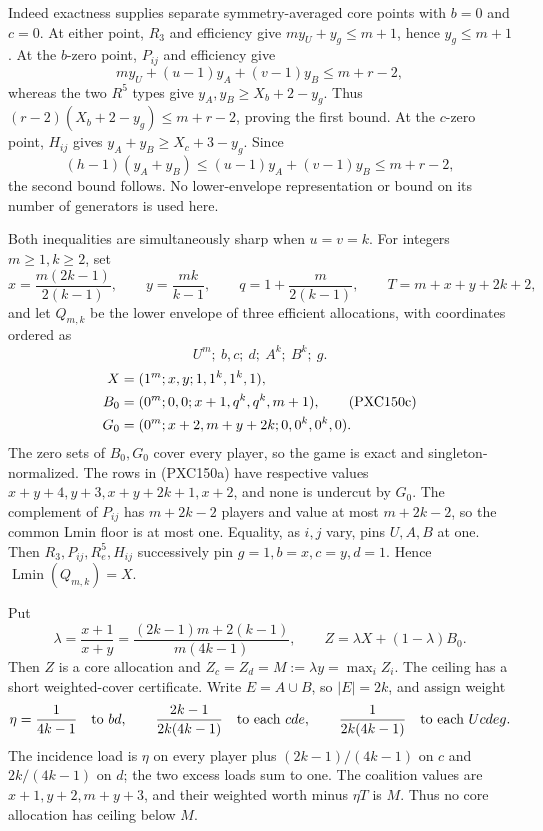 \documentclass[11pt]{article}
\newcommand{\Lmin}{\operatorname{Lmin}}
\begin{document}
Indeed exactness supplies separate symmetry-averaged core points with
\(b=0\) and \(c=0\).  At either point, \(R_3\) and efficiency give
\(m y_U+y_g\le m+1\), hence \(y_g\le m+1\).  At the \(b\)-zero point,
\(P_{ij}\) and efficiency give
\[
 m y_U+(u-1)y_A+(v-1)y_B\le m+r-2,
\]
whereas the two \(R^5\) types give
\(y_A,y_B\ge X_b+2-y_g\).  Thus
\((r-2)(X_b+2-y_g)\le m+r-2\), proving the first bound.
At the \(c\)-zero point, \(H_{ij}\) gives
\(y_A+y_B\ge X_c+3-y_g\).  Since
\[
 (h-1)(y_A+y_B)\le (u-1)y_A+(v-1)y_B\le m+r-2,
\]
the second bound follows.  No lower-envelope representation or bound on its
number of generators is used here.

Both inequalities are simultaneously sharp when \(u=v=k\).  For integers
\(m\ge1,k\ge2\), set
\[
 x=\frac{m(2k-1)}{2(k-1)},\qquad y=\frac{mk}{k-1},\qquad
 q=1+\frac{m}{2(k-1)},\qquad T=m+x+y+2k+2,
\]
and let \(Q_{m,k}\) be the lower envelope of three efficient allocations, with
coordinates ordered as
\[
 U^m;\ b,c;\ d;\ A^k;\ B^k;\ g.
\]
\begin{align}
 X&=(1^m;x,y;1,1^k,1^k,1),\notag\\
 B_0&=(0^m;0,0;x+1,q^k,q^k,m+1),                 \tag{PXC150c}\\
 G_0&=(0^m;x+2,m+y+2k;0,0^k,0^k,0).\notag
\end{align}
The zero sets of \(B_0,G_0\) cover every player, so the game is exact and
singleton-normalized.  The rows in (PXC150a) have respective values
\(x+y+4,y+3,x+y+2k+1,x+2\), and none is undercut by \(G_0\).
The complement of \(P_{ij}\) has \(m+2k-2\) players and value at most
\(m+2k-2\), so the common Lmin floor is at most one.  Equality, as \(i,j\)
vary, pins \(U,A,B\) at one.  Then \(R_3,P_{ij},R^5_e,H_{ij}\) successively
pin \(g=1,b=x,c=y,d=1\).  Hence \(\Lmin(Q_{m,k})=X\).

Put
\begin{equation}
 \lambda=\frac{x+1}{x+y}
 =\frac{(2k-1)m+2(k-1)}{m(4k-1)},\qquad
 Z=\lambda X+(1-\lambda)B_0.                         \tag{PXC150d}
\end{equation}
Then \(Z\) is a core allocation and \(Z_c=Z_d=M:=\lambda y=\max_iZ_i\).
The ceiling has a short weighted-cover certificate.  Write
\(E=A\cup B\), so \(|E|=2k\), and assign weight
\[
 \eta=\frac1{4k-1}\quad\hbox{to }bd,\qquad
 \frac{2k-1}{2k(4k-1)}\quad\hbox{to each }cde,\qquad
 \frac1{2k(4k-1)}\quad\hbox{to each }Ucd e g.
\]
The incidence load is \(\eta\) on every player plus
\((2k-1)/(4k-1)\) on \(c\) and \(2k/(4k-1)\) on \(d\); the two excess
loads sum to one.  The coalition values are \(x+1,y+2,m+y+3\), and their
weighted worth minus \(\eta T\) is \(M\).  Thus no core allocation has
ceiling below \(M\).
\end{document}
